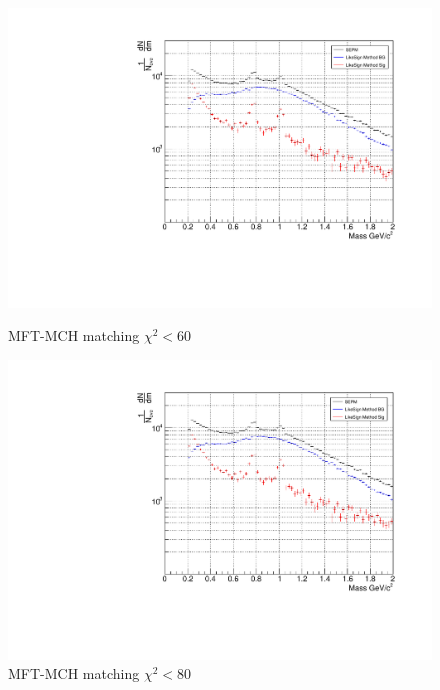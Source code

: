 \begin{figure}[H]
                \vspace{1em}
                \begin{minipage}{0.45\textwidth}
                    \centering
                    \includegraphics[width=\textwidth]{fig/3_4_4_CB_chi2_60.pdf}
                    \caption*{MFT-MCH matching $\chi^2 < 60$}
                \end{minipage}
                \hfill
                \begin{minipage}{0.45\textwidth}
                    \centering
                    \includegraphics[width=\textwidth]{fig/3_4_4_CB_chi2_80.pdf}
                    \caption*{MFT-MCH matching $\chi^2 < 80$} 
             

\end{minipage}
\end{figure}
